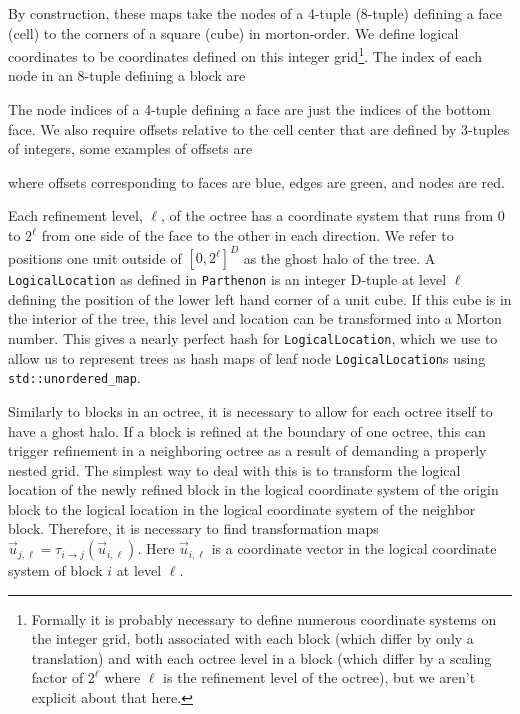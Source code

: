 \documentclass{article}
\begin{document}
By construction, these maps take the nodes of a 4-tuple (8-tuple) defining a face (cell) to the corners of a square (cube) in morton-order. We define logical coordinates to be coordinates defined on this integer grid\footnote{Formally it is probably necessary to define numerous coordinate systems on the integer grid, both associated with each block (which differ by only a translation) and with each octree level in a block (which differ by a scaling factor of $2^\ell$ where $\ell$ is the refinement level of the octree), but we aren't explicit about that here.}. The index of each node in an 8-tuple defining a block are
\begin{center}

\end{center}
The node indices of a 4-tuple defining a face are just the indices of the bottom face. We also require offsets relative to the cell center that are defined by 3-tuples of integers, some examples of offsets are
\begin{center}

\end{center}
where offsets corresponding to faces are blue, edges are green, and nodes are red.


Each refinement level, $\ell$, of the octree has a coordinate system that runs from 0 to $2^\ell$ from one side of the face to the other in each direction. We refer to positions one unit outside of $[0, 2^\ell]^D$ as the ghost halo of the tree. A \texttt{LogicalLocation} as defined in \texttt{Parthenon} is an integer D-tuple at level $\ell$ defining the position of the lower left hand corner of a unit cube. If this cube is in the interior of the tree, this level and location can be transformed into a Morton number. This gives a nearly perfect hash for \texttt{LogicalLocation}, which we use to allow us to represent trees as hash maps of leaf node \texttt{LogicalLocation}s using \texttt{std::unordered\_map}.

Similarly to blocks in an octree, it is necessary to allow for each octree itself to have a ghost halo. If a block is refined at the boundary of one octree, this can trigger refinement in a neighboring octree as a result of demanding a properly nested grid. The simplest way to deal with this is to transform the logical location of the newly refined block in the logical coordinate system of the origin block to the logical location in the logical coordinate system of the neighbor block. Therefore, it is necessary to find transformation maps $\vec{u}_{j,\ell} = \tau_{i \rightarrow j}(\vec{u}_{i, \ell})$. Here $\vec{u}_{i, \ell}$ is a coordinate vector in the logical coordinate system of block $i$ at level $\ell$. 
\end{document}
